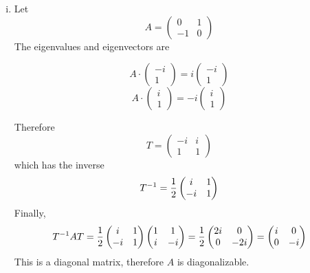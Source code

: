 \documentclass[../../script.tex]{subfiles}
\begin{document}
\begin{eg}
    \begin{enumerate}[(i)]
        \item Let 
        \[
            A = \begin{pmatrix}
                0 & 1 \\ -1 & 0
            \end{pmatrix}
        \]
        The eigenvalues and eigenvectors are 
        \begin{multicols}{2}\noindent
            \[
                A \cdot \begin{pmatrix}
                    -i \\ 1
                \end{pmatrix}
                =
                i \begin{pmatrix}
                    -i \\ 1
                \end{pmatrix}
            \]
            \[
                A \cdot \begin{pmatrix}
                    i \\ 1
                \end{pmatrix}
                =
                -i \begin{pmatrix}
                    i \\ 1
                \end{pmatrix}
            \]
        \end{multicols}
        \noindent Therefore 
        \[
            T = \begin{pmatrix}
                -i & i \\ 1 & 1
            \end{pmatrix}
        \]
        which has the inverse 
        \[
            {T}^{-1} = \frac{1}{2} \begin{pmatrix}
                i & 1 \\ -i & 1
            \end{pmatrix}
        \]
        Finally,
        \[
            {T}^{-1}AT = \frac{1}{2}
            \begin{pmatrix}
                i & 1 \\ -i & 1
            \end{pmatrix}
            \begin{pmatrix}
                1 & 1 \\ i & -i
            \end{pmatrix}
            = \frac{1}{2}
            \begin{pmatrix}
                2i & 0 \\ 0 & -2i
            \end{pmatrix}
            =
            \begin{pmatrix}
                i & 0 \\ 0 & -i
            \end{pmatrix}
        \]
        This is a diagonal matrix, therefore $A$ is diagonalizable.


\end{enumerate}
\end{eg}
\end{document}

